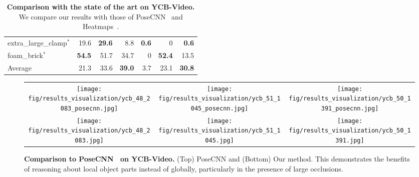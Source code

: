 \documentclass[10pt,twocolumn,letterpaper]{article}
\begin{document}
\begin{table}
{\begin{tabular}{lrrr!{\vrule width 1pt}rrr}
{\small extra\_large\_clamp}$^*$ & 19.6 & {\bf 29.6} & 8.8 & {\bf 0.6} & 0 & {\bf 0.6} \\
{\small foam\_brick}$^*$ & {\bf 54.5} & 51.7 & 34.7 & 0 & {\bf 52.4} & 13.5 \\
		\midrule
		Average		& 21.3	&	33.6	&	{\bf 39.0}	& 3.7	& 23.1	& {\bf 30.8} \\
		\bottomrule
	\end{tabular}
}
	\vspace{-3mm}
	\caption{{\bf Comparison with the state of the art on YCB-Video.} We compare our results with those of PoseCNN~\cite{Xiang18b} and Heatmaps~\cite{Oberweger18}.}
	\label{tab:ycbvideo_eval}
\end{table} 
 
 

\begin{figure*}[htbp]
	\centering
	\begin{tabular}{ccc}
	\texttt{[image: fig/results\_visualization/ycb\_48\_2083\_posecnn.jpg]}&
	\texttt{[image: fig/results\_visualization/ycb\_51\_1045\_posecnn.jpg]}&
	\texttt{[image: fig/results\_visualization/ycb\_50\_1391\_posecnn.jpg]}\\
	\texttt{[image: fig/results\_visualization/ycb\_48\_2083.jpg]}&
	\texttt{[image: fig/results\_visualization/ycb\_51\_1045.jpg]}&
	\texttt{[image: fig/results\_visualization/ycb\_50\_1391.jpg]}
	\end{tabular}
	\vspace{-2mm}
	\caption{{\bf Comparison to PoseCNN~\cite{Xiang18b} on YCB-Video.} (Top) PoseCNN and (Bottom) Our method. This demonstrates the benefits of reasoning about local object parts instead of globally, particularly in the presence of large occlusions.}
	\label{fig:results_visualization_ycb}
\end{figure*} 
 
\end{document}
